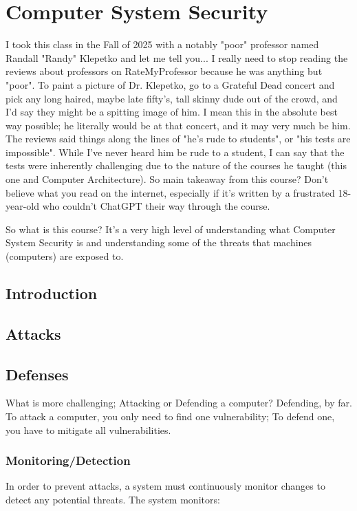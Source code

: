 \chapter{Computer System Security}
I took this class in the Fall of 2025 with a notably "poor" professor named
Randall "Randy" Klepetko and let me tell you... I really need to stop reading the reviews
about professors on RateMyProfessor because he was anything but "poor". To paint a picture
of Dr. Klepetko, go to a Grateful Dead concert and pick any long haired, maybe late fifty's,
tall skinny dude out of the crowd, and I'd say they might be a spitting image of him. I mean
this in the absolute best way possible; he literally would be at that concert, and it may
very much be him. The reviews said things along the lines of "he's rude to students", or
"his tests are impossible". While I've never heard him be rude to a student, I can say that
the tests were inherently challenging due to the nature of the courses he taught (this one and
Computer Architecture). So main takeaway from this course? Don't believe what you read on the
internet, especially if it's written by a frustrated 18-year-old who couldn't ChatGPT their
way through the course.

So what is this course? It's a very high level of understanding what Computer System Security
is and understanding some of the threats that machines (computers) are exposed to.

\section{Introduction}
\section{Attacks}
\section{Defenses}
What is more challenging; Attacking or Defending a computer? Defending, by far.
To attack a computer, you only need to find one vulnerability; To defend one, you
have to mitigate all vulnerabilities.



\subsection{Monitoring/Detection}
In order to prevent attacks, a system must continuously monitor changes to detect
any potential threats. The system monitors:

